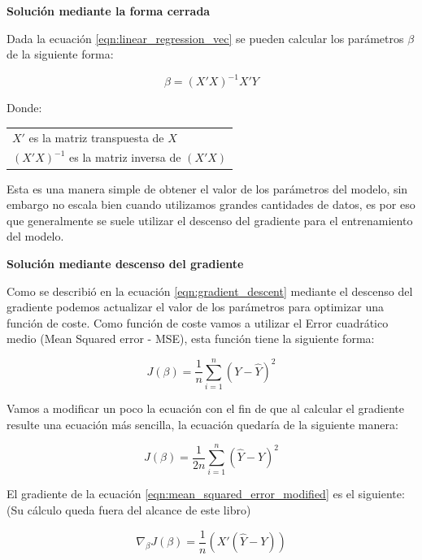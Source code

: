 \documentclass[11pt,fleqn]{book} %
\begin{document}
\clearpage

\textbf{Solución mediante la forma cerrada}

Dada la ecuación \ref{eqn:linear_regression_vec} se pueden calcular los parámetros $\beta$ de la siguiente forma:

\begin{equation}
\label{eqn:linear_regression_closed_form_solution}
\beta = (X' X)^{-1}X'Y
\end{equation}

Donde:

\begin{tabular}{l}
	$X'$ es la matriz transpuesta de $X$\\
	$(X' X)^{-1}$ es la matriz inversa de $(X' X)$\\
\end{tabular}

Esta es una manera simple de obtener el valor de los parámetros del modelo, sin embargo no escala bien cuando utilizamos grandes cantidades de datos, es por eso que generalmente se suele utilizar el descenso del gradiente para el entrenamiento del modelo.

\textbf{Solución mediante descenso del gradiente}

Como se describió en la ecuación \ref{eqn:gradient_descent} mediante el descenso del gradiente podemos actualizar el valor de los parámetros para optimizar una función de coste.  Como función de coste vamos a utilizar el Error cuadrático medio (Mean Squared error - MSE), esta función tiene la siguiente forma:

\begin{equation}
\label{eqn:mean_squared_error}
J(\beta)=\frac{1}{n} \sum_{i=1}^{n}\left (Y - \hat{Y}  \right )^{2}
\end{equation}

Vamos a modificar un poco la ecuación con el fin de que al calcular el gradiente resulte una ecuación más sencilla, la ecuación quedaría de la siguiente manera:

\begin{equation}
\label{eqn:mean_squared_error_modified}
J(\beta)=\frac{1}{2n} \sum_{i=1}^{n}\left (\hat{Y} - Y  \right )^{2}
\end{equation}

El gradiente de la ecuación \ref{eqn:mean_squared_error_modified} es el siguiente: (Su cálculo queda fuera del alcance de este libro)

\begin{equation}
\label{eqn:gradient_mean_squared_error_modified}
\nabla _{\beta} J(\beta) =  \frac{1}{n} \left ( X' (\hat{Y}-Y ) \right )
\end{equation}
\end{document}
